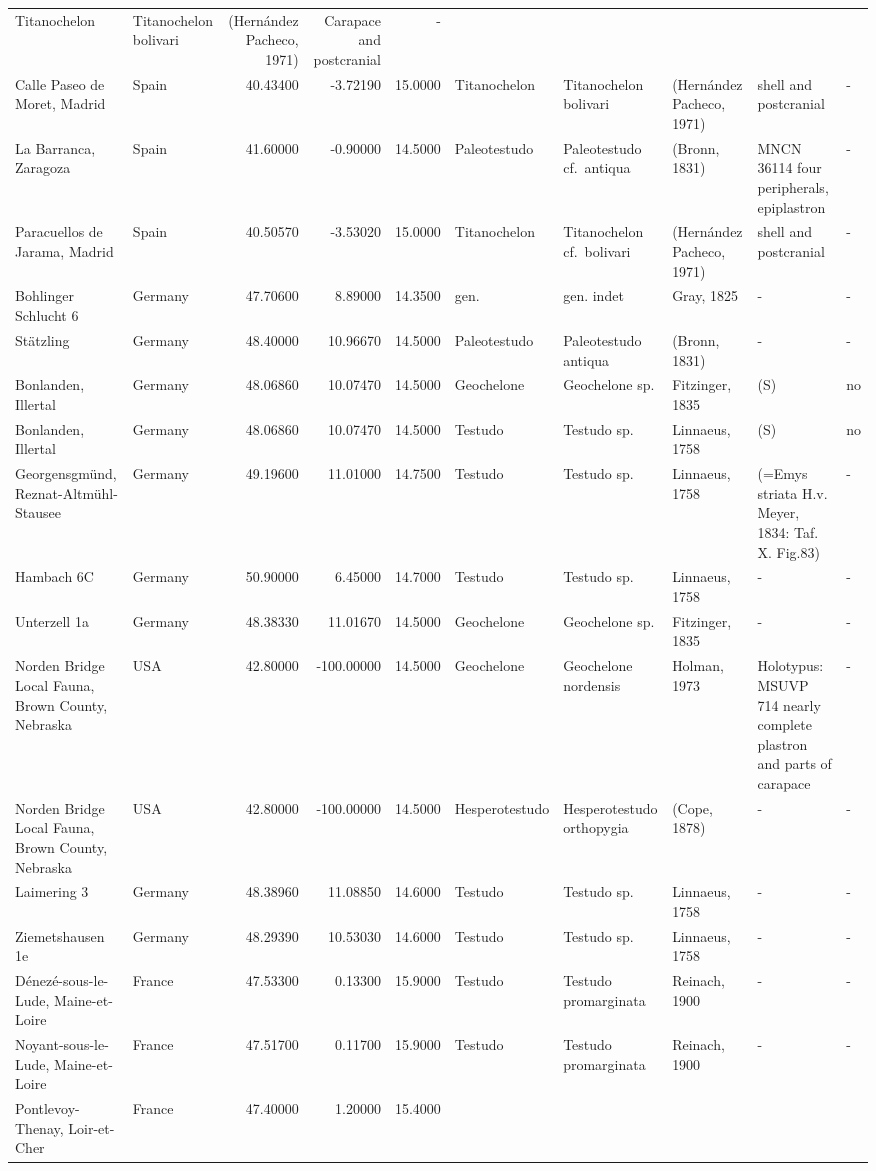 \begin{landscape}
{\begin{longtable}[]{@{}llrrrlllll@{}}
Titanochelon & Titanochelon bolivari & (Hernández Pacheco, 1971) &
Carapace and postcranial & -\tabularnewline
Calle Paseo de Moret, Madrid & Spain & 40.43400 & -3.72190 & 15.0000 &
Titanochelon & Titanochelon bolivari & (Hernández Pacheco, 1971) & shell
and postcranial & -\tabularnewline
La Barranca, Zaragoza & Spain & 41.60000 & -0.90000 & 14.5000 &
Paleotestudo & Paleotestudo cf.~antiqua & (Bronn, 1831) & MNCN 36114
four peripherals, epiplastron & -\tabularnewline
Paracuellos de Jarama, Madrid & Spain & 40.50570 & -3.53020 & 15.0000 &
Titanochelon & Titanochelon cf.~bolivari & (Hernández Pacheco, 1971) &
shell and postcranial & -\tabularnewline
Bohlinger Schlucht 6 & Germany & 47.70600 & 8.89000 & 14.3500 & gen. &
gen. indet & Gray, 1825 & - & -\tabularnewline
Stätzling & Germany & 48.40000 & 10.96670 & 14.5000 & Paleotestudo &
Paleotestudo antiqua & (Bronn, 1831) & - & -\tabularnewline
Bonlanden, Illertal & Germany & 48.06860 & 10.07470 & 14.5000 &
Geochelone & Geochelone sp. & Fitzinger, 1835 & (S) & no\tabularnewline
Bonlanden, Illertal & Germany & 48.06860 & 10.07470 & 14.5000 & Testudo
& Testudo sp. & Linnaeus, 1758 & (S) & no\tabularnewline
Georgensgmünd, Reznat-Altmühl-Stausee & Germany & 49.19600 & 11.01000 &
14.7500 & Testudo & Testudo sp. & Linnaeus, 1758 & (=Emys striata H.v.
Meyer, 1834: Taf. X. Fig.83) & -\tabularnewline
Hambach 6C & Germany & 50.90000 & 6.45000 & 14.7000 & Testudo & Testudo
sp. & Linnaeus, 1758 & - & -\tabularnewline
Unterzell 1a & Germany & 48.38330 & 11.01670 & 14.5000 & Geochelone &
Geochelone sp. & Fitzinger, 1835 & - & -\tabularnewline
Norden Bridge Local Fauna, Brown County, Nebraska & USA & 42.80000 &
-100.00000 & 14.5000 & Geochelone & Geochelone nordensis & Holman, 1973
& Holotypus: MSUVP 714 nearly complete plastron and parts of carapace &
-\tabularnewline
Norden Bridge Local Fauna, Brown County, Nebraska & USA & 42.80000 &
-100.00000 & 14.5000 & Hesperotestudo & Hesperotestudo orthopygia &
(Cope, 1878) & - & -\tabularnewline
Laimering 3 & Germany & 48.38960 & 11.08850 & 14.6000 & Testudo &
Testudo sp. & Linnaeus, 1758 & - & -\tabularnewline
Ziemetshausen 1e & Germany & 48.29390 & 10.53030 & 14.6000 & Testudo &
Testudo sp. & Linnaeus, 1758 & - & -\tabularnewline
Dénezé-sous-le-Lude, Maine-et-Loire & France & 47.53300 & 0.13300 &
15.9000 & Testudo & Testudo promarginata & Reinach, 1900 & - &
-\tabularnewline
Noyant-sous-le-Lude, Maine-et-Loire & France & 47.51700 & 0.11700 &
15.9000 & Testudo & Testudo promarginata & Reinach, 1900 & - &
-\tabularnewline
Pontlevoy-Thenay, Loir-et-Cher & France & 47.40000 & 1.20000 & 15.4000 &

\end{longtable}}
\end{landscape}
